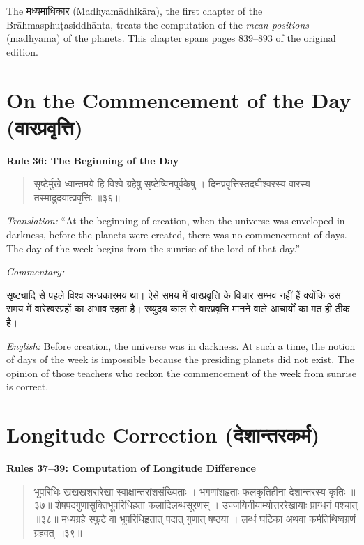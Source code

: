 \documentclass[11pt,a4paper]{book}
\newcommand{\dev}[1]{{\devanagarifont #1}}
\newenvironment{shloka}{%
  \begin{verse}
  \devanagarifont\color{versecolor}%
}{\end{verse}}
\newenvironment{vasaanaskt}{%
  \par\vspace{0.5em}\noindent\small\textit{Commentary:}%
}{\par\vspace{0.5em}}
\newcommand{\ruleheading}[1]{%
  \par\vspace{0.8em}\noindent\textbf{\color{sectioncolor}#1}\par\vspace{0.3em}%
}
\begin{document}
\noindent
The \dev{मध्यमाधिकार} (Madhyamādhikāra), the first chapter of the Brāhmasphuṭasiddhānta, treats the computation of the \emph{mean positions} (madhyama) of the planets. This chapter spans pages 839--893 of the original edition.

\section{On the Commencement of the Day (\dev{वारप्रवृत्ति})}

\ruleheading{Rule 36: The Beginning of the Day}

\begin{shloka}
\begin{altverse}
\dev{सृष्टेर्मुखे ध्वान्तमये हि विश्वे ग्रहेषु सृष्टेष्विनपूर्वकेषु ।}
\dev{दिनप्रवृत्तिस्तदघीश्वरस्य वारस्य तस्मादुदयात्प्रवृत्तिः ॥३६॥}
\end{altverse}
\end{shloka}

\textit{Translation:} ``At the beginning of creation, when the universe was enveloped in darkness, before the planets were created, there was no commencement of days. The day of the week begins from the sunrise of the lord of that day.''

\begin{vasaanaskt}
\dev{सृष्ट्यादि से पहले विश्व अन्धकारमय था। ऐसे समय में वारप्रवृत्ति के विचार सम्भव नहीं हैं क्योंकि उस समय में वारेश्वरग्रहों का अभाव रहता है। रव्युदय काल से वारप्रवृत्ति मानने वाले आचार्यों का मत ही ठीक है।}

\textit{English:} Before creation, the universe was in darkness. At such a time, the notion of days of the week is impossible because the presiding planets did not exist. The opinion of those teachers who reckon the commencement of the week from sunrise is correct.
\end{vasaanaskt}

\section{Longitude Correction (\dev{देशान्तरकर्म})}

\ruleheading{Rules 37--39: Computation of Longitude Difference}

\begin{shloka}
\begin{altverse}
\dev{भूपरिधिः खखखशरारेखा स्वाक्षान्तरांशसंख्यिताः ।}
\dev{भगणांशहृताः फलकृतिहीना देशान्तरस्य कृतिः ॥३७॥}
\dev{शेषपदगुणासुक्तिभूपरिधिहता कलादिलब्धसूरणस् ।}
\dev{उज्जयिनीयाम्योत्तररेखायाः प्राग्धनं पश्चात् ॥३८॥}
\dev{मध्यग्रहे स्फुटे वा भूपरिधिहृतात् पदात् गुणात् षष्ठया ।}
\dev{लब्धं घटिका अथवा कर्मतिथिष्वग्रणं ग्रहवत् ॥३९॥}
\end{altverse}
\end{shloka}
\end{document}
